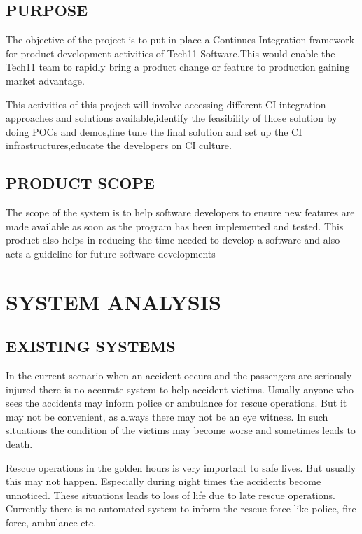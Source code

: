 \documentclass[12pt,a4paper,oneside]{report}
\begin{document}
{\section{PURPOSE}
\par The objective of the project is to put in place a Continues Integration framework for product
development activities of Tech11 Software.This would enable the Tech11 team to rapidly bring a
product change or feature to production gaining market advantage.
\par
This activities of this project will involve accessing different CI integration approaches and
solutions available,identify the feasibility of those solution by doing POCs and demos,fine tune the
final solution and set up the CI infrastructures,educate the developers on CI culture.

\section{PRODUCT SCOPE}
\par  The scope of the system is to help software developers to ensure new features are made available as soon as the program has been
implemented and tested. This product also helps in reducing the time needed to develop a software and also acts a guideline for future software developments
\\

\chapter{SYSTEM ANALYSIS}
\hspace{0.2in} 
\section{EXISTING SYSTEMS}
	\par In the current scenario when an accident occurs and the passengers are seriously injured there is no accurate system to help accident victims. Usually anyone who sees the accidents may inform police or ambulance for rescue operations. But it may not be convenient, as always there may not be an eye witness. In such situations the condition of the victims may become worse and sometimes leads to death.
	\par Rescue operations in the golden hours is very important to safe lives. But usually this may not happen. Especially during night times the accidents become unnoticed. These situations leads to loss of life due to late rescue operations. Currently there is no automated system to inform the rescue force like police, fire force, ambulance etc.


}
\end{document}
